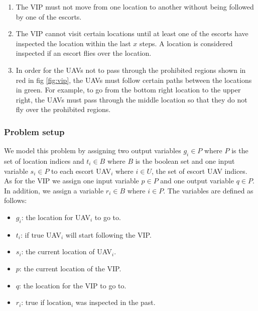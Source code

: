 \documentclass[]{article}
\begin{document}
\begin{enumerate}
\def\labelenumi{\arabic{enumi}.}
\itemsep1pt\parskip0pt
\item
  The VIP must not move from one location to another without being
  followed by one of the escorts.
\item
  The VIP cannot visit certain locations until at least one of the
  escorts have inspected the location within the last $x$ steps. A location is considered inspected if an escort flies over the location.
\item
    In order for the UAVs not to pass through the prohibited regions shown in red in fig \ref{fig:vip}, the UAVs must follow certain paths between the locations in green. For example, to go from the bottom right location to the upper right, the UAVs must pass through the middle location so that they do not fly over the prohibited regions.
\end{enumerate}

\subsubsection{Problem setup}\label{problem-setup}

We model this problem by assigning two output variables $g_{i} \in P$ where $P$ is the set of location indices and $t_{i}\in B$ where $B$ is the boolean set and one input variable $s_{i} \in P$ to each escort UAV$_{i}$ where $i \in U$, the set of escort UAV indices. As for the VIP we assign one input variable $p \in P$ and one output variable $q \in P$. In addition, we assign a variable $r_{i} \in B$ where $i \in P$. The variables are defined as follows:

\begin{itemize}
        \item
            $g_{i}$: the location for UAV$_{i}$ to go to.
        \item
            $t_{i}$: if true UAV$_{i}$ will start following the VIP\@.
        \item
            $s_{i}$: the current location of UAV$_{i}$.
        \item
            $p$: the current location of the VIP.
        \item
            $q$: the location for the VIP to go to.
        \item
            $r_{i}$: true if location$_{i}$ was inspected in the past.
\end{itemize}
\end{document}
